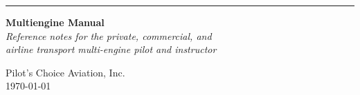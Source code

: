 \documentclass[11pt,twoside,letterpaper,onecolumn]{book}
\newenvironment{dedication}
  {\clearpage           %
   \thispagestyle{empty}%
   \vspace*{\stretch{1}}%
   \itshape             %
   \raggedleft          %
  }
  {\par %
   \vspace{\stretch{3}} %
   \clearpage           %
  }
\begin{document}
\begin{titlepage} %
\raggedleft %
\rule{1pt}{\textheight} %
\hspace{0.05\textwidth} %
\parbox[b]{0.75\textwidth}{ %
{\Huge\bfseries Multiengine Manual}\\[2\baselineskip] %
{\large\textit{Reference notes for the private, commercial, and \\
    airline transport multi-engine pilot and instructor}}\\[4\baselineskip] %


\vspace{0.5\textheight} %

{\noindent Pilot's Choice Aviation, Inc.}\\[\baselineskip] %
{\noindent \today }\\[\baselineskip] %
}

\end{titlepage}

\end{document}
